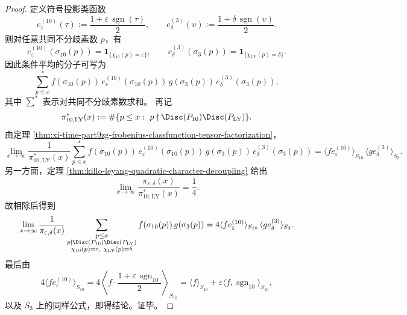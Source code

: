 \begin{proof}
定义符号投影类函数
\[
e_{\varepsilon}^{(10)}(\tau):=\frac{1+\varepsilon\,\operatorname{sgn}(\tau)}{2},
\qquad
e_{\delta}^{(3)}(\upsilon):=\frac{1+\delta\,\operatorname{sgn}(\upsilon)}{2}.
\]
则对任意共同不分歧素数 \(p\)，有
\[
e_{\varepsilon}^{(10)}(\sigma_{10}(p))
=
\mathbf 1_{\{\chi_{10}(p)=\varepsilon\}},
\qquad
e_{\delta}^{(3)}(\sigma_3(p))
=
\mathbf 1_{\{\chi_{\mathrm{LY}}(p)=\delta\}}.
\]
因此条件平均的分子可写为
\[
\sum_{p\le x}^{\ast}
f(\sigma_{10}(p))\,e_{\varepsilon}^{(10)}(\sigma_{10}(p))\,
g(\sigma_3(p))\,e_{\delta}^{(3)}(\sigma_3(p)),
\]
其中 \(\sum^{\ast}\) 表示对共同不分歧素数求和。
再记
\[
\pi_{10,\mathrm{LY}}^\ast(x)
:=
\#\{p\le x:\ p\nmid \Disc(P_{10})\Disc(P_{\mathrm{LY}})\}.
\]
由定理 \ref{thm:xi-time-part9zg-frobenius-classfunction-tensor-factorization}，
\[
\lim_{x\to\infty}
\frac{1}{\pi_{10,\mathrm{LY}}^\ast(x)}
\sum_{p\le x}^{\ast}
f(\sigma_{10}(p))\,e_{\varepsilon}^{(10)}(\sigma_{10}(p))\,
g(\sigma_3(p))\,e_{\delta}^{(3)}(\sigma_3(p))
=
\langle f e_{\varepsilon}^{(10)}\rangle_{S_{10}}\,
\langle g e_{\delta}^{(3)}\rangle_{S_3}.
\]
另一方面，定理 \ref{thm:killo-leyang-quadratic-character-decoupling} 给出
\[
\lim_{x\to\infty}\frac{\pi_{\varepsilon,\delta}(x)}{\pi_{10,\mathrm{LY}}^\ast(x)}=\frac14.
\]
故相除后得到
\[
\lim_{x\to\infty}
\frac{1}{\pi_{\varepsilon,\delta}(x)}
\sum_{\substack{p\le x\\ p\nmid \Disc(P_{10})\Disc(P_{\mathrm{LY}})\\
\chi_{10}(p)=\varepsilon,\ \chi_{\mathrm{LY}}(p)=\delta}}
f(\sigma_{10}(p))\,g(\sigma_3(p))
=
4\langle f e_{\varepsilon}^{(10)}\rangle_{S_{10}}\,
\langle g e_{\delta}^{(3)}\rangle_{S_3}.
\]
最后由
\[
4\langle f e_{\varepsilon}^{(10)}\rangle_{S_{10}}
=
4\left\langle
f\cdot \frac{1+\varepsilon\,\operatorname{sgn}_{10}}{2}
\right\rangle_{S_{10}}
=
\langle f\rangle_{S_{10}}+\varepsilon\langle f,\operatorname{sgn}_{10}\rangle_{S_{10}},
\]
以及 \(S_3\) 上的同样公式，即得结论。证毕。
\end{proof}

